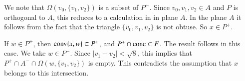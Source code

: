 \begin{tarskidata}
\begin{tarski}
\begin{proved}
We note that $\Omega(v_0,\{v_1,v_2\})$ is a subset of $P^+$.  Since
$v_0,v_1,v_2\in A$ and $P$ is orthogonal to $A$, this reduces to
a calculation in in plane $A$.  In the plane $A$ it follows from
the fact that the triangle $\{v_0,v_1,v_2\}$ is not obtuse.  So $x\in P^+$.

If $w\in P^+$, then ${\operatorname{conv}}\{x,w\}\subset P^+$, and
$P^+\cap {\operatorname{cone}} \subset F$.  The result follows in this case.
We take $w\in P^-$.  Since $|v_1-v_2|<\sqrt8$, 
this implies that $P^+\cap A^-\cap \Omega(w,\{v_1,v_2\})$
is empty.  This contradicts the assumption that $x$ belongs to this
intersection.
%
%
%
%
%
%
% 
\swallowed\end{proved}
\end{tarski}


\end{tarskidata}
